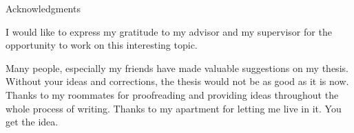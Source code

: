 \thispagestyle{empty}

\vspace*{20mm}

\begin{center}
{ Acknowledgments}
\end{center}

\vspace{10mm}

I would like to express my gratitude to my advisor \getAdvisor{} and my supervisor \getSupervisor{} for the opportunity to work on this interesting topic.

Many people, especially my friends have made valuable suggestions on my thesis. Without your ideas and corrections, the thesis would not be as good as it is now. Thanks to my roommates for proofreading and providing ideas throughout the whole process of writing. Thanks to my apartment for letting me live in it. You get the idea.


\cleardoublepage{}
